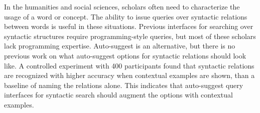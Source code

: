 
In the humanities and social sciences, scholars often need to characterize the usage of a word or concept. The ability to issue queries over syntactic relations between words is useful in these situations.  Previous interfaces for  searching over syntactic structures require programming-style queries, but most of these scholars lack programming expertise. Auto-suggest is an alternative, but there is no previous work on what auto-suggest options for syntactic relations should look like. A controlled experiment with 400 participants found that syntactic relations are recognized with higher accuracy when contextual examples are shown, than a baseline of naming the relations alone.  This indicates that auto-suggest query interfaces for syntactic search should augment the options with contextual examples.

